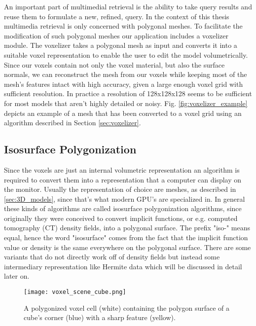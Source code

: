 An important part of multimedial retrieval is the ability to take query results and reuse them to formulate a new, refined, query. In the context of this thesis multimedia retrieval
is only concerned with polygonal meshes. To facilitate the modification of such polygonal meshes our application includes a voxelizer module. The voxelizer takes a polygonal
mesh as input and converts it into a suitable voxel representation to enable the user to edit the model volumetrically. Since
our voxels contain not only the voxel material, but also the surface normals, we can reconstruct the mesh from our voxels while keeping most of the mesh's features intact with high accuracy, given
a large enough voxel grid with sufficient resolution. In practice a resolution of 128x128x128 seems to be sufficient for most models that aren't highly detailed or noisy.
Fig. \ref{fig:voxelizer_example} depicts an example of a mesh that has been converted to a voxel grid using an algorithm described in Section \ref{sec:voxelizer}.

\subsection{Isosurface Polygonization}

Since the voxels are just an internal volumetric representation an algorithm is required to convert them into a representation that a computer can display on the monitor. Usually the representation of choice are meshes, as described in \ref{sec:3D_models}, since that's what modern GPU's are specialized in. In general these kinds of algorithms are called isosurface polygonization algorithms, since originally they were conceived to convert implicit functions, or e.g.
computed tomography (CT) density fields, into a polygonal surface. The prefix "iso-" means equal, hence the word "isosurface" comes from the fact that the implicit function value or density is the same everywhere on the polygonal surface. There are some variants that do not directly work off of density fields but instead some intermediary representation like Hermite data which will be discussed in detail later on.

\begin{figure}
\centering
\captionsetup{width=0.8\textwidth}
\texttt{[image: voxel\_scene\_cube.png]}
\caption{A polygonized voxel cell (white) containing the polygon surface of a cube's corner (blue) with a sharp feature (yellow).}
\label{fig:polygonized_cube_voxel_cell}
\end{figure}


